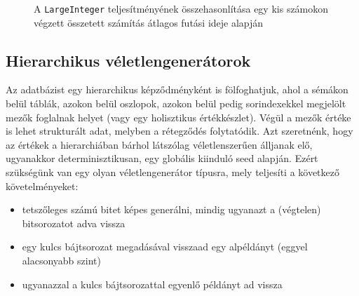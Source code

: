 \documentclass[
    parspace,
    noindent,
    nohyp,
]{elteiktdk}[2023/04/10]
\begin{document}
\begin{figure}[H]
    \centering
    \caption[A \texttt{LargeInteger} teljesítményének összevetése]{
        A \texttt{LargeInteger} teljesítményének összehasonlítása
        egy kis számokon végzett összetett számítás átlagos futási ideje alapján
    }
\end{figure}


\subsection{Hierarchikus véletlengenerátorok}

Az adatbázist egy hierarchikus képződményként is fölfoghatjuk,
ahol a sémákon belül táblák, azokon belül oszlopok,
azokon belül pedig sorindexekkel megjelölt mezők foglalnak helyet
(vagy egy holisztikus értékkészlet).
Végül a mezők értéke is lehet strukturált adat, melyben a rétegződés folytatódik.
Azt szeretnénk, hogy az értékek a hierarchiában bárhol látszólag véletlenszerűen álljanak elő,
ugyanakkor determinisztikusan, egy globális kiinduló seed alapján.
Ezért szükségünk van egy olyan véletlengenerátor típusra,
mely teljesíti a következő követelményeket:

\begin{itemize}
    \item tetszőleges számú bitet képes generálni, mindig ugyanazt a (végtelen) bitsorozatot adva vissza
   \item egy kulcs bájtsorozat megadásával visszaad egy alpéldányt (eggyel alacsonyabb szint)
   \item ugyanazzal a kulcs bájtsorozattal egyenlő példányt ad vissza
\end{itemize}
\end{document}
